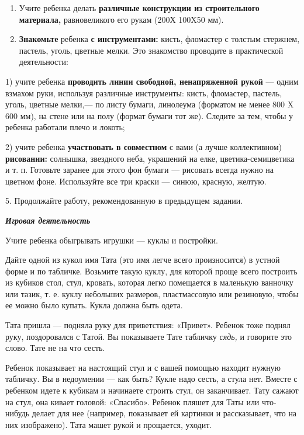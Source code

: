 \documentclass[a5paper]{book}
\renewcommand{\emph}[1]{\textit{#1}}
\begin{document}
\begin{enumerate}
\def\labelenumi{\arabic{enumi}.}
\setcounter{enumi}{2}
\item
  
  Учите ребенка делать \textbf{различные конструкции из строительного
  материала,} равновеликого его рукам (200Х 100X50 мм).
  
\item
  
  \textbf{Знакомьте} ребенка \textbf{с инструментами:} кисть, фломастер
  с толстым стержнем, пастель, уголь, цветные мелки. Это знакомство
  проводите в практической деятельности:
  
\end{enumerate}


1) учите ребенка \textbf{проводить линии свободной, ненапряженной рукой}
--- одним взмахом руки, используя различные инструменты: кисть,
фломастер, пастель, уголь, цветные мелки,--- по листу бумаги, линолеума
(форматом не менее 800 X 600 мм), на стене или на полу (формат бумаги
тот же). Следите за тем, чтобы у ребенка работали плечо и локоть;

2) учите ребенка \textbf{участвовать в совместном} с вами (а лучше
коллективном) \textbf{рисовании:} солнышка, звездного неба, украшений на
елке, цветика-семицветика и т. п. Готовьте заранее для этого фон бумаги
--- рисовать всегда нужно на цветном фоне. Используйте все три краски
--- синюю, красную, желтую.

5. Продолжайте работу, рекомендованную в предыдущем задании.

\emph{\textbf{Игровая деятельность}}

Учите ребенка обыгрывать игрушки --- куклы и постройки.

Дайте одной из кукол имя Тата (это имя легче всего произносится) в
устной форме и по табличке. Возьмите такую куклу, для которой проще
всего построить из кубиков стол, стул, кровать, которая легко помещается
в маленькую ванночку или тазик, т. е. куклу небольших размеров,
пластмассовую или резиновую, чтобы ее можно было купать. Кукла должна
быть одета.

Тата пришла --- подняла руку для приветствия: «Привет». Ребенок тоже
поднял руку, поздоровался с Татой. Вы показываете Тате табличку
\emph{сядь,} и говорите это слово. Тате не на что сесть.

Ребенок показывает на настоящий стул и с вашей помощью находит нужную
табличку. Вы в недоумении --- как быть? Кукле надо сесть, а стула нет.
Вместе с ребенком идете к кубикам и начинаете строить стул, он
заканчивает. Тату сажают на стул, она кивает головой: «Спасибо». Ребенок
пляшет для Таты или что-нибудь делает для нее (например, показывает ей
картинки и рассказывает, что на них изображено). Тата машет рукой и
прощается, уходит.
\end{document}
